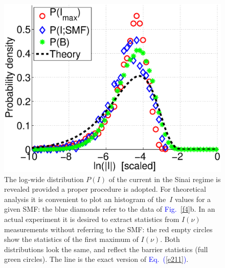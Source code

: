\documentclass[aps,pre,floats,floatfix,twocolumn]{revtex4}
\newcommand{\Eq}[1]{\textcolor{blue}{Eq.\!\!~(\ref{#1})}}
\newcommand{\Fig}[1]{\textcolor{blue}{Fig.}\!\!~\ref{#1}}
\begin{document}
\begin{figure}
\includegraphics[width=\hsize]{PlnI.eps}

\caption{The log-wide distribution $P(I)$ of the current 
in the Sinai regime is revealed provided a proper procedure 
is adopted. For theoretical analysis it is convenient 
to plot an histogram of the~$I$ values for a given SMF:
the blue diamonds refer to the data of \Fig{f4}b.  
%
In an actual experiment it is desired to extract
statistics from $I(\nu)$ measurements without 
referring to the SMF: the red empty circles 
show the statistics of the first maximum of $I(\nu)$.    
%
Both distributions look the same, and reflect 
the barrier statistics (full green circles). 
The line is the exact version of \Eq{e211}.}

\label{f5}
\end{figure}
\end{document}
